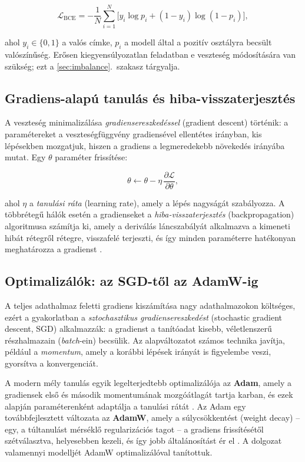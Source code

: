 \begin{equation}
  \mathcal{L}_{\mathrm{BCE}} = -\frac{1}{N}\sum_{i=1}^{N}
  \big[ y_i \log p_i + (1 - y_i)\log(1 - p_i) \big],
  \label{eq:bce}
\end{equation}

ahol $y_i \in \{0,1\}$ a valós címke, $p_i$ a modell által a pozitív osztályra
becsült valószínűség. Erősen kiegyensúlyozatlan feladatban e veszteség
módosítására van szükség; ezt a \ref{sec:imbalance}.~szakasz tárgyalja.

\subsection{Gradiens-alapú tanulás és hiba-visszaterjesztés}

A veszteség minimalizálása \textit{gradiensereszkedéssel} (gradient descent)
történik: a paramétereket a veszteségfüggvény gradiensével ellentétes irányban,
kis lépésekben mozgatjuk, hiszen a gradiens a legmeredekebb növekedés irányába
mutat. Egy $\theta$ paraméter frissítése:

\begin{equation}
  \theta \leftarrow \theta - \eta \, \frac{\partial \mathcal{L}}{\partial \theta},
  \label{eq:gd}
\end{equation}

ahol $\eta$ a \textit{tanulási ráta} (learning rate), amely a lépés nagyságát
szabályozza. A többrétegű hálók esetén a gradienseket a \textit{hiba-visszaterjesztés}
(backpropagation) algoritmusa számítja ki, amely a deriválás láncszabályát
alkalmazva a kimeneti hibát rétegről rétegre, visszafelé terjeszti, és így
minden paraméterre hatékonyan meghatározza a gradienst \cite{goodfellow2016deep}.

\subsection{Optimalizálók: az SGD-től az AdamW-ig}

A teljes adathalmaz feletti gradiens kiszámítása nagy adathalmazokon költséges,
ezért a gyakorlatban a \textit{sztochasztikus gradiensereszkedést} (stochastic
gradient descent, SGD) alkalmazzák: a gradienst a tanítóadat kisebb,
véletlenszerű részhalmazain (\textit{batch}-ein) becsülik. Az alapváltozatot
számos technika javítja, például a \textit{momentum}, amely a korábbi lépések
irányát is figyelembe veszi, gyorsítva a konvergenciát.

A modern mély tanulás egyik legelterjedtebb optimalizálója az \textbf{Adam},
amely a gradiensek első és második momentumának mozgóátlagát tartja karban, és
ezek alapján paraméterenként adaptálja a tanulási rátát \cite{kingma2015adam}. Az
Adam egy továbbfejlesztett változata az \textbf{AdamW}, amely a súlycsökkentést
(weight decay) -- egy, a túltanulást mérséklő regularizációs tagot -- a gradiens
frissítésétől szétválasztva, helyesebben kezeli, és így jobb általánosítást ér el
\cite{loshchilov2019adamw}. A dolgozat valamennyi modelljét AdamW
optimalizálóval tanítottuk.

